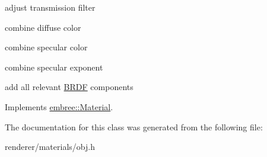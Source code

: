 adjust transmission filter

combine diffuse color

combine specular color

combine specular exponent

add all relevant \hyperlink{classembree_1_1_b_r_d_f}{BRDF} components 



Implements \hyperlink{classembree_1_1_material_a371ca178d6cc226c3d6c758cb41f8cef}{embree::Material}.



The documentation for this class was generated from the following file:\begin{DoxyCompactItemize}
\item 
renderer/materials/obj.h\end{DoxyCompactItemize}
